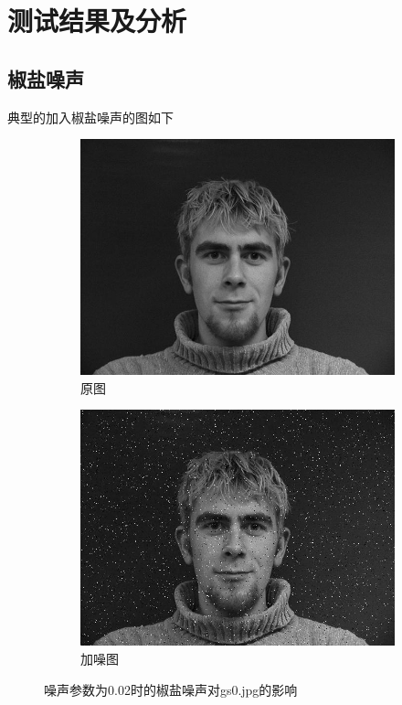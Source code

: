 \section{测试结果及分析}
\label{sec:result-and-analysis}

\subsection{椒盐噪声}
\label{sec:speckle-data}

典型的加入椒盐噪声的图如下
\begin{figure}[H]
  \centering
  \begin{subfigure}[b]{0.4\textwidth}
    \includegraphics[keepaspectratio=true,
    width=\textwidth]{images/gs0.jpg}
    \caption{原图}
  \end{subfigure}
  \begin{subfigure}[b]{0.4\textwidth}
    \includegraphics[keepaspectratio=true,
    width=\textwidth]{images/gs0_0.02_speckle.jpg}
    \caption{加噪图}
  \end{subfigure}
  \caption{噪声参数为0.02时的椒盐噪声对gs0.jpg的影响}
\label{fig:speckle-ex-img}
\end{figure}

